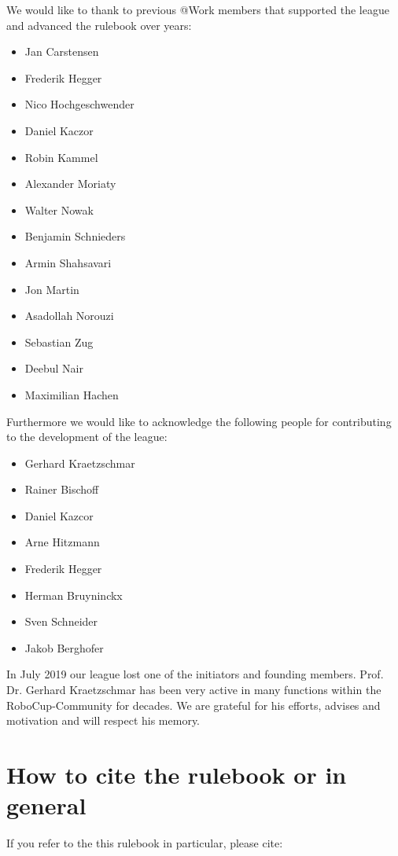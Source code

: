 \begin{titlepage}
We would like to thank to previous @Work members that supported the league and advanced the rulebook over years:
\begin{itemize}
\item Jan Carstensen 
\item Frederik Hegger
\item Nico Hochgeschwender 
\item Daniel Kaczor 
\item Robin Kammel 
\item Alexander Moriaty 
\item Walter Nowak 
\item Benjamin Schnieders
\item Armin Shahsavari 
\item Jon Martin 
\item Asadollah Norouzi
\item Sebastian Zug
\item Deebul Nair
\item Maximilian Hachen
\end{itemize}


Furthermore we would like to acknowledge the following people for contributing to the development
of the \RCAW league:

\begin{itemize}
	\item Gerhard Kraetzschmar
	\item Rainer Bischoff
	\item Daniel Kazcor
	\item Arne Hitzmann
	\item Frederik Hegger
	\item Herman Bruyninckx
	\item Sven Schneider
	\item Jakob Berghofer
\end{itemize}
In July 2019 our league lost one of the initiators and founding members. Prof. Dr. Gerhard
Kraetzschmar has been very active in many functions within the RoboCup-Community
for decades. We are grateful for his efforts, advises and motivation and will respect his memory.


\begin{minipage}{\textwidth}
\section*{How to cite the rulebook or \RCAW in general}
If you refer to the this rulebook in particular, please cite:


\end{minipage}
\end{titlepage}
